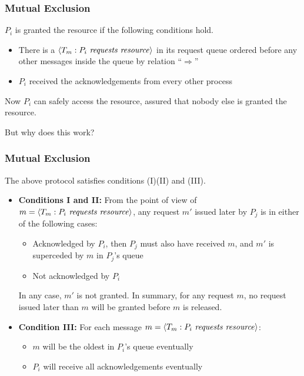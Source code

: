 \documentclass{beamer}
\begin{document}
\frame
{
  \frametitle{Mutual Exclusion}

  $P_i$ is granted the resource if the following conditions hold.

  \begin{itemize}
  	\item<2-> There is a $\langle T_m:P_i\text{ \emph{requests resource}}\rangle$ in its request queue ordered before any other messages inside the queue by relation ``$\Rightarrow$''
  	\item<3-> $P_i$ received the acknowledgements from every other process
  \end{itemize}
   Now $P_i$ can safely access the resource, assured that nobody else is granted the resource.

   But why does this work?
}

\frame
{
  \frametitle{Mutual Exclusion}
  The above protocol satisfies conditions (I)(II) and (III).

  \begin{itemize}
  	\item<2-> \textbf{Conditions I and II:} From the point of view of $m=\langle T_m:P_i\text{ \emph{requests resource}}\rangle$, any request $m'$ issued later by $P_j$ is in either of the following cases:
  		\begin{itemize}
  			\item Acknowledged by $P_i$, then $P_j$ must also have received $m$, and $m'$ is superceded by $m$ in $P_j$'s queue
  			\item Not acknowledged by $P_i$
  		\end{itemize}
  	In any case, $m'$ is not granted.
  	 In summary, for any request $m$, no request issued later than $m$ will be granted before $m$ is released.
		\item<4-> \textbf{Condition III:} For each message $m=\langle T_m:P_i\text{ \emph{requests resource}}\rangle$:
			\begin{itemize}
				\item $m$ will be the oldest in $P_i$'s queue eventually
				\item $P_i$ will receive all acknowledgements eventually
			\end{itemize}
  \end{itemize}
}
\end{document}
